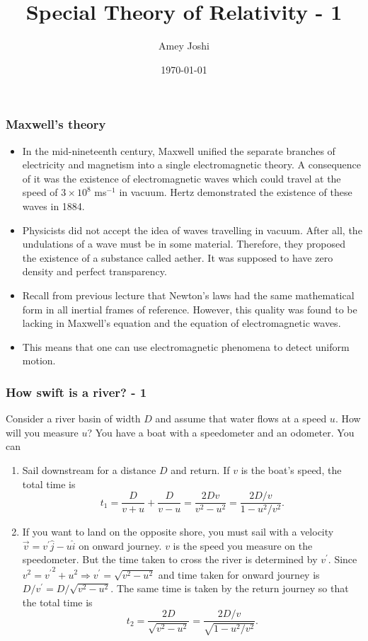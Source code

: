 \documentclass{beamer}
\title{Special Theory of Relativity - 1}
\author{Amey Joshi}
\date{\today}
\begin{document}
\begin{frame}
\titlepage
\end{frame}

\begin{frame}
\frametitle{Maxwell's theory}
\begin{itemize}
\item In the mid-nineteenth century, Maxwell unified the separate branches of
electricity and magnetism into a single electromagnetic theory. A consequence
of it was the existence of electromagnetic waves which could travel at the
speed of $3 \times 10^8$ ms${}^{-1}$ in vacuum. Hertz demonstrated the 
existence of these waves in 1884.
\item Physicists did not accept the idea of waves travelling in vacuum. After 
all, the undulations of a wave must be in some material. Therefore, they 
proposed the existence of a substance called aether. It was supposed to have
zero density and perfect transparency.
\item Recall from previous lecture that Newton's laws had the same mathematical
form in all inertial frames of reference. However, this quality was found to
be lacking in Maxwell's equation and the equation of electromagnetic waves.
\item This means that one can use electromagnetic phenomena to detect uniform
motion. 
\end{itemize}
\end{frame}

\begin{frame}
\frametitle{How swift is a river? - 1}
Consider a river basin of width $D$ and assume that water flows at a speed $u$.
How will you measure $u$? You have a boat with a speedometer and an odometer. 
You can
\begin{enumerate}
\item Sail downstream for a distance $D$ and return. If $v$ is the boat's speed,
the total time is
\begin{equation}\label{e1}
t_1 = \frac{D}{v + u} + \frac{D}{v - u} = \frac{2Dv}{v^2 - u^2} = 
\frac{2D/v}{1 - u^2/v^2}.
\end{equation}
\item If you want to land on the opposite shore, you must sail with a velocity
$\vec{v} = v^\prime\hat{j} - u\hat{i}$ on onward journey. $v$ is the speed you 
measure on the speedometer. But the time taken to cross the river is determined 
by $v^\prime$. Since $v^2 = {v^\prime}^2 + u^2 \Rightarrow v^\prime = 
\sqrt{v^2 - u^2}$ and time taken for onward journey is $D/v^\prime = 
D/\sqrt{v^2 - u^2}$. The same time is taken by the return journey so that the 
total time is
\begin{equation}\label{e2}
t_2 = \frac{2D}{\sqrt{v^2 - u^2}} = \frac{2D/v}{\sqrt{1 - u^2/v^2}}.
\end{equation}
\end{enumerate}
\end{frame}
\end{document}
